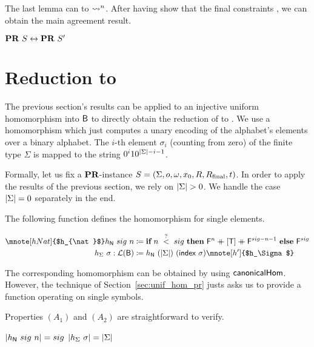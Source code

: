 The last lemma can   to $\rightsquigarrow_{}^n$.
After having show that the final constraints , we can obtain the main agreement result.
\begin{theorem}\label{thm:hom_pr_equiv}
  $\textbf{PR}{}~S \leftrightarrow \textbf{PR}{}~S'$
\end{theorem}

\section{Reduction to \BPR{}}
The previous section's results can be applied to an injective uniform homomorphism into $\textsf{B}$ to directly obtain the reduction of \PR{} to \BPR{}. 
We use a homomorphism which just computes a unary encoding of the alphabet's elements over a binary alphabet. The $i$-th element $\sigma_i$ (counting from zero) of the finite type $\Sigma$ is mapped to the string $0^i10^{|\Sigma|-i-1}$.

Formally, let us fix a $\textbf{PR}{}$-instance $S = (\Sigma, o, \omega, x_0, R, R_{\text{final}}, t)$. In order to apply the results of the previous section, we rely on $|\Sigma| > 0$. We handle the case $|\Sigma| = 0$ separately in the end.

The following function defines the homomorphism for single elements. 
\begin{definition}\label{def:hnat_hsig}
  \begin{align*}
    \mnote[hNat]{$h_{\nat}$}
    h_{\nat}~sig~n&\defeq \ITE{n~\overset{?}{<}~sig}{\bfalse^n \concat [\btrue] \concat \bfalse^{sig -n -1}}{\bfalse^{sig}} \\
    h_{\Sigma}~\sigma : \listsof{\bool} &\defeq h_{\nat}~(\length{\Sigma})~(\textsf{index}~\sigma)\mnote[h']{$h_\Sigma$}
  \end{align*}
\end{definition}
The corresponding homomorphism can be obtained by using $\textsf{canonicalHom}$. However, the technique of Section~\ref{sec:unif_hom_pr} justs asks us to provide a function operating on single symbols.

Properties $(A_1)$ and $(A_2)$ are straightforward to verify.

\begin{fact}[Uniformity]\leavevmode
  \begin{enumerate}
     $|h_{\mathsf{N}}~sig~n| = sig$
    \coqitem[hP_length] $|h_{\Sigma}~\sigma| = |\Sigma|$
  \end{enumerate}
\end{fact}

